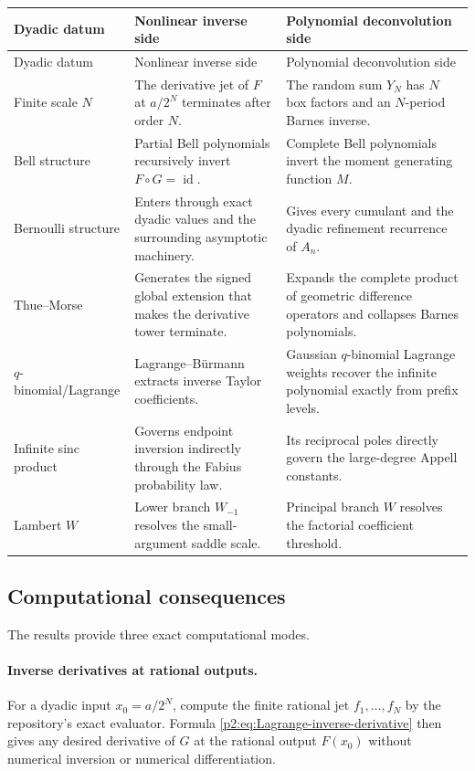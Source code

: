 \documentclass[11pt,oneside]{article}
\numberwithin{equation}{section}
\theoremstyle{definition}
\theoremstyle{remark}
\begin{document}
\begin{longtable}{@{}p{}p{}p{}@{}}
\toprule
Dyadic datum & Nonlinear inverse side & Polynomial deconvolution side \\
\midrule
\endfirsthead
\toprule
Dyadic datum & Nonlinear inverse side & Polynomial deconvolution side \\
\midrule
\endhead
Finite scale $N$
& The derivative jet of $F$ at $a/2^N$ terminates after order $N$.
& The random sum $Y_N$ has $N$ box factors and an $N$-period Barnes inverse. \\
\addlinespace
Bell structure
& Partial Bell polynomials recursively invert $F\circ G=\operatorname{id}$.
& Complete Bell polynomials invert the moment generating function $M$. \\
\addlinespace
Bernoulli structure
& Enters through exact dyadic values and the surrounding asymptotic machinery.
& Gives every cumulant and the dyadic refinement recurrence of $A_n$. \\
\addlinespace
Thue--Morse
& Generates the signed global extension that makes the derivative tower terminate.
& Expands the complete product of geometric difference operators and collapses Barnes polynomials. \\
\addlinespace
$q$-binomial/Lagrange
& Lagrange--B\"urmann extracts inverse Taylor coefficients.
& Gaussian $q$-binomial Lagrange weights recover the infinite polynomial exactly from prefix levels. \\
\addlinespace
Infinite sinc product
& Governs endpoint inversion indirectly through the Fabius probability law.
& Its reciprocal poles directly govern the large-degree Appell constants. \\
\addlinespace
Lambert $W$
& Lower branch $W_{-1}$ resolves the small-argument saddle scale.
& Principal branch $W$ resolves the factorial coefficient threshold. \\
\bottomrule
\end{longtable}

\subsection{Computational consequences}

The results provide three exact computational modes.

\paragraph{Inverse derivatives at rational outputs.}
For a dyadic input $x_0=a/2^N$, compute the finite rational jet $f_1,\ldots,f_N$ by the repository's
exact evaluator.  Formula \eqref{p2:eq:Lagrange-inverse-derivative} then gives any desired derivative of
$G$ at the rational output $F(x_0)$ without numerical inversion or numerical differentiation.
\end{document}
